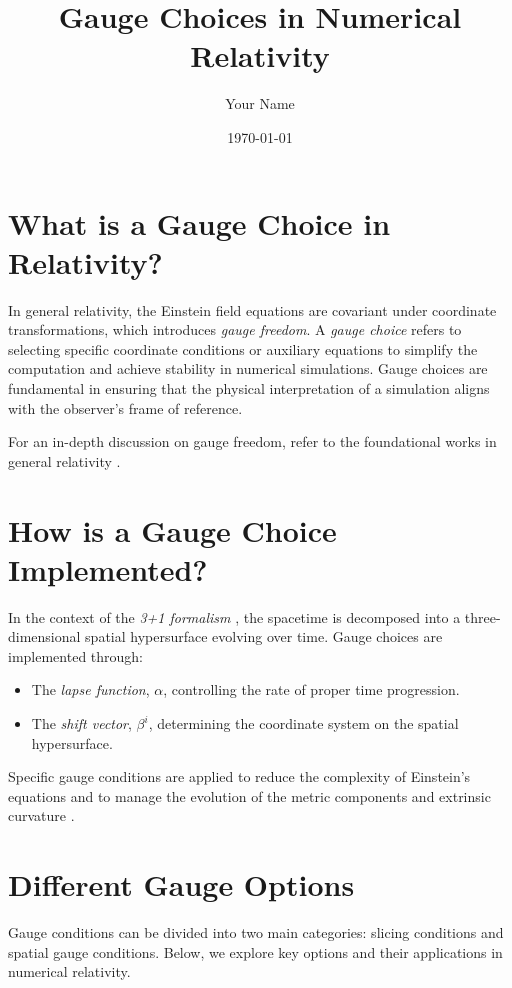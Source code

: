 \documentclass[11pt,a4paper]{article}
\title{Gauge Choices in Numerical Relativity}
\author{Your Name}
\date{\today}
\begin{document}
\maketitle
\tableofcontents

\section{What is a Gauge Choice in Relativity?}
In general relativity, the Einstein field equations are covariant under coordinate transformations, which introduces \textit{gauge freedom}. A \textit{gauge choice} refers to selecting specific coordinate conditions or auxiliary equations to simplify the computation and achieve stability in numerical simulations. Gauge choices are fundamental in ensuring that the physical interpretation of a simulation aligns with the observer's frame of reference.

For an in-depth discussion on gauge freedom, refer to the foundational works in general relativity \cite{wald1984general,gourgoulhon2012three}.

\section{How is a Gauge Choice Implemented?}
In the context of the \textit{3+1 formalism} \cite{gourgoulhon2012three,alcubierre2008introduction}, the spacetime is decomposed into a three-dimensional spatial hypersurface evolving over time. Gauge choices are implemented through:
\begin{itemize}
    \item The \textit{lapse function}, $\alpha$, controlling the rate of proper time progression.
    \item The \textit{shift vector}, $\beta^i$, determining the coordinate system on the spatial hypersurface.
\end{itemize}

Specific gauge conditions are applied to reduce the complexity of Einstein's equations and to manage the evolution of the metric components and extrinsic curvature \cite{baumgarte2010numerical,alcubierre2008introduction}. 

\section{Different Gauge Options}
Gauge conditions can be divided into two main categories: slicing conditions and spatial gauge conditions. Below, we explore key options and their applications in numerical relativity.
\end{document}
